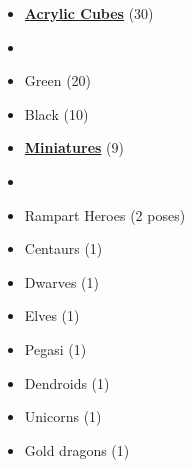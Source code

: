\begin{multicols*}{3}
\begin{itemize}[leftmargin=0pt, label={}, noitemsep]
  \item \textbf{\normalsize{\underline{Acrylic Cubes}}} (30)
  \item
  \item Green (20)
  \item Black (10)
\end{itemize}

\begin{itemize}[leftmargin=0pt, label={}, noitemsep]
  \item \textbf{\normalsize{\underline{Miniatures}}} (9)
  \item
  \item Rampart Heroes (2 poses)
  \item Centaurs (1)
  \item Dwarves (1)
  \item Elves (1)
  \item Pegasi (1)
  \item Dendroids (1)
  \item Unicorns (1)
  \item Gold dragons (1)
\end{itemize}

\columnbreak


\end{multicols*}
